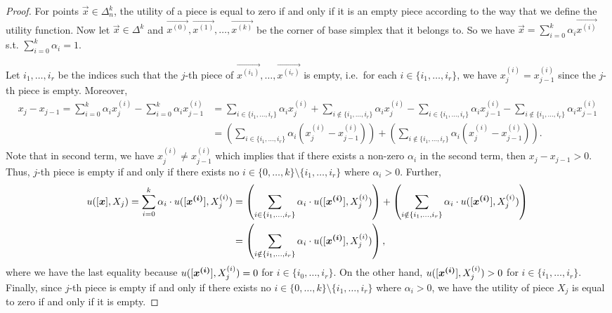 \begin{proof}
    For points $\vec{x} \in \Delta^k_n$, the utility of a piece is equal to zero if and only if it is an empty piece according to the way that we define the utility function. Now let $\vec{x} \in \Delta^k$ and $\vec{x^{(0)}}, \vec{x^{(1)}}, \ldots, \vec{x^{(k)}}$ be the corner of base simplex that it belongs to. So we have $\vec{x} = \sum_{i=0}^k \alpha_i \vec{x^{(i)}}$ s.t. $\sum_{i=0}^k \alpha_i = 1$.  
    
    
    Let $i_1, \ldots, i_r$ be the indices such that the $j$-th piece of $\vec{x^{(i_1)}}, \ldots, \vec{x^{(i_r)}}$ is empty, i.e.~for each $i \in \{i_1, \ldots, i_r\}$, we have $x^{(i)}_j = x^{(i)}_{j-1}$ since the $j$-th piece is empty. Moreover,
    \begin{align*}
        x_j - x_{j-1} = \sum_{i = 0}^k \alpha_i x^{(i)}_j - \sum_{i = 0}^k \alpha_i x^{(i)}_{j-1} &= \sum_{i \in \{i_1, \ldots, i_r\}} \alpha_i x^{(i)}_j + \sum_{i \notin \{i_1, \ldots, i_r\}} \alpha_i x^{(i)}_j - \sum_{i \in \{i_1, \ldots, i_r\}} \alpha_i x^{(i)}_{j-1} - \sum_{i \notin \{i_1, \ldots, i_r\}} \alpha_i x^{(i)}_{j-1}\\
        &= \left(\sum_{i \in \{i_1, \ldots, i_r\}} \alpha_i (x_j^{(i)} - x_{j-1}^{(i)}) \right) + \left( \sum_{i \notin \{i_1, \ldots, i_r\}} \alpha_i (x_j^{(i)} - x_{j-1}^{(i)})\right).
    \end{align*}
    Note that in second term, we have $x^{(i)}_j \neq x^{(i)}_{j-1}$ which implies that if there exists a non-zero $\alpha_i$ in the second term, then $x_j - x_{j-1} > 0$. Thus, $j$-th piece is empty if and only if there exists no $i \in \{0, \ldots, k\} \setminus \{i_1, \ldots, i_r\}$ where $\alpha_i > 0$. Further,
    \begin{align*}
        u([\boldsymbol{x}], X_j) = \sum_{i=0}^k \alpha_i \cdot u([\boldsymbol{x^{(i)}}], X^{(i)}_j) &= \left(\sum_{i \in \{i_1, \ldots, i_r\}} \alpha_i \cdot u([\boldsymbol{x^{(i)}}], X^{(i)}_j) \right) + \left( \sum_{i \notin \{i_1, \ldots, i_r\}} \alpha_i \cdot u([\boldsymbol{x^{(i)}}], X^{(i)}_j) \right)\\
        & = \left( \sum_{i \notin \{i_1, \ldots, i_r\}} \alpha_i \cdot u([\boldsymbol{x^{(i)}}], X^{(i)}_j) \right),
    \end{align*}
    where we have the last equality because $u([\boldsymbol{x^{(i)}}], X^{(i)}_j) = 0$ for $i \in \{i_0, \ldots, i_r\}$. On the other hand, $u([\boldsymbol{x^{(i)}}], X^{(i)}_j) > 0$  for $i \in \{i_1, \ldots, i_r\}$. Finally, since $j$-th piece is empty if and only if there exists no $i \in \{0, \ldots, k\} \setminus \{i_1, \ldots, i_r\}$ where $\alpha_i > 0$, we have the utility of piece $X_j$ is equal to zero if and only if it is empty.
\end{proof}


